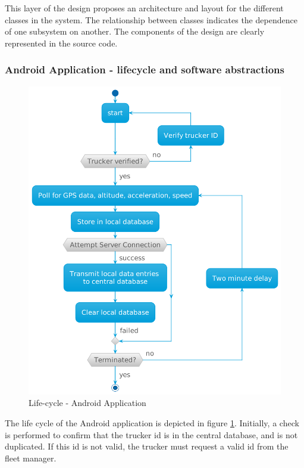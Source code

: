 This layer of the design proposes an architecture and layout for the different classes in the system.
The relationship between classes indicates the dependence of one subsystem on another.
The components of the design are clearly represented in the source code.

\subsubsection{Android Application - lifecycle and software abstractions}
\begin{figure}
\centering
\includegraphics[scale=0.4]{../diag/android_activity.png}
\caption{Life-cycle - Android Application}
\label{fig:android_activity}
\end{figure}

The life cycle of the Android application is depicted in figure \ref{fig:android_activity}.
Initially, a check is performed to confirm that the trucker \ac{id} is in the central database, and is not duplicated.
If this \ac{id} is not valid, the trucker must request a valid \ac{id} from the fleet manager.

